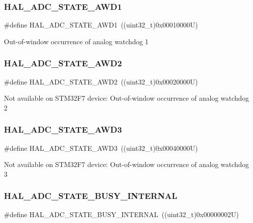 \subsubsection{\texorpdfstring{HAL\_ADC\_STATE\_AWD1}{HAL\_ADC\_STATE\_AWD1}}
{\footnotesize\ttfamily \#define H\+A\+L\+\_\+\+A\+D\+C\+\_\+\+S\+T\+A\+T\+E\+\_\+\+A\+W\+D1~((uint32\+\_\+t)0x00010000\+U)}

Out-\/of-\/window occurrence of analog watchdog 1 \mbox{\label{group___a_d_c___exported___types_gae6e9712c706ca7f2998dfb5cf776b48f}} 
\subsubsection{\texorpdfstring{HAL\_ADC\_STATE\_AWD2}{HAL\_ADC\_STATE\_AWD2}}
{\footnotesize\ttfamily \#define H\+A\+L\+\_\+\+A\+D\+C\+\_\+\+S\+T\+A\+T\+E\+\_\+\+A\+W\+D2~((uint32\+\_\+t)0x00020000\+U)}

Not available on S\+T\+M32\+F7 device\+: Out-\/of-\/window occurrence of analog watchdog 2 \mbox{\label{group___a_d_c___exported___types_gaa43e91fedb9ce41e36bc78ced4f3912e}} 
\subsubsection{\texorpdfstring{HAL\_ADC\_STATE\_AWD3}{HAL\_ADC\_STATE\_AWD3}}
{\footnotesize\ttfamily \#define H\+A\+L\+\_\+\+A\+D\+C\+\_\+\+S\+T\+A\+T\+E\+\_\+\+A\+W\+D3~((uint32\+\_\+t)0x00040000\+U)}

Not available on S\+T\+M32\+F7 device\+: Out-\/of-\/window occurrence of analog watchdog 3 \mbox{\label{group___a_d_c___exported___types_ga7055248355e179ee208d23bd2ce8ba69}} 
\subsubsection{\texorpdfstring{HAL\_ADC\_STATE\_BUSY\_INTERNAL}{HAL\_ADC\_STATE\_BUSY\_INTERNAL}}
{\footnotesize\ttfamily \#define H\+A\+L\+\_\+\+A\+D\+C\+\_\+\+S\+T\+A\+T\+E\+\_\+\+B\+U\+S\+Y\+\_\+\+I\+N\+T\+E\+R\+N\+AL~((uint32\+\_\+t)0x00000002\+U)}

